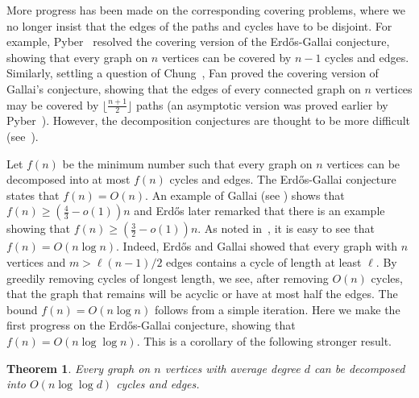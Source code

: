 \documentclass[11pt]{article}
\newtheorem{theorem}{Theorem}[section]
\begin{document}
More progress has been made on the corresponding covering problems, where we no longer insist that the edges of the paths and cycles have to be disjoint. For example, Pyber~\cite{P85} resolved the covering version of the Erd\H{o}s-Gallai conjecture, showing that every graph on $n$ vertices can be covered by $n-1$ cycles and edges. Similarly, settling a question of Chung~\cite{C80}, Fan \cite{F02} proved the covering version of Gallai's conjecture, showing that the edges of every connected graph on $n$ vertices may be covered by $\lfloor \frac{n+1}{2} \rfloor$ paths (an asymptotic version was proved earlier by Pyber~\cite{P96}). However, the decomposition conjectures are thought to be more difficult (see~\cite{C80, P92}).


Let $f(n)$ be the minimum number such that every graph on $n$ vertices can be decomposed into at most $f(n)$ cycles and edges. The Erd\H{o}s-Gallai conjecture states that $f(n)=O(n)$. An example of Gallai (see \cite{EGP66}) shows that $f(n) \geq (\frac{4}{3} - o(1))n$ and Erd\H{o}s \cite{E83} later remarked that there is an example showing that $f(n) \geq (\frac{3}{2}-o(1))n$. As noted in~\cite{EGP66}, it is easy to see that $f(n)=O(n\log n)$. Indeed, Erd\H{o}s and Gallai \cite{EG59} showed that every graph with $n$ vertices and $m > \ell(n-1)/2$ edges contains a cycle of length at least $\ell$. By greedily removing cycles of longest length, we see, after removing $O(n)$ cycles, that the graph that remains will be acyclic or have at most half the edges. The bound $f(n)=O(n\log n)$ follows from a simple iteration. Here we make the first progress on the Erd\H{o}s-Gallai conjecture, showing that $f(n)=O(n \log \log n)$.
This is a corollary of the following stronger result.

\begin{theorem}\label{firstmain}
Every graph on $n$ vertices with average degree $d$ can be decomposed into $O(n \log \log d)$ cycles and edges.
\end{theorem}
\end{document}
